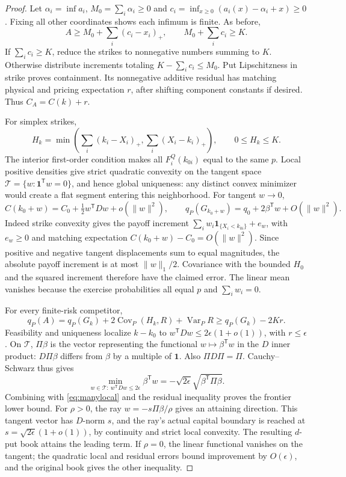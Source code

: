 \documentclass[11pt,a4paper]{amsart}
\theoremstyle{plain}
\theoremstyle{definition}
\theoremstyle{remark}
\DeclareMathOperator{\Var}{Var}
\DeclareMathOperator{\Cov}{Cov}
\newcommand{\one}{\mathbf{1}}
\begin{document}
\begin{proof}
Let $\alpha_i=\inf a_i$, $M_0=\sum_i\alpha_i\ge0$ and
$c_i=\inf_{x\ge0}(a_i(x)-\alpha_i+x)\ge0$. Fixing all other coordinates shows each infimum is finite. As before,
\[
 A\ge M_0+\sum_i(c_i-x_i)_+,\qquad M_0+\sum_i c_i\ge K.
\]
If $\sum_i c_i\ge K$, reduce the strikes to nonnegative numbers summing to $K$. Otherwise distribute increments totaling $K-\sum_i c_i\le M_0$. Put Lipschitzness in strike proves containment. Its nonnegative additive residual has matching physical and pricing expectation $r$, after shifting component constants if desired. Thus $C_A=C(k)+r$.

For simplex strikes,
\[
 H_k=\min\left(\sum_i(k_i-X_i)_+,\sum_i(X_i-k_i)_+\right),
 \qquad 0\le H_k\le K.
\]
The interior first-order condition makes all $F_i^Q(k_{0i})$ equal to the same $p$. Local positive densities give strict quadratic convexity on the tangent space
$\mathcal T=\{w:\one^{\mathsf T}w=0\}$, and hence global uniqueness: any distinct convex minimizer would create a flat segment entering this neighborhood. For tangent $w\to0$,
\begin{equation}\label{eq:manylocal}
 C(k_0+w)=C_0+\tfrac12w^{\mathsf T}Dw+o(\|w\|^2),\qquad
 q_P(G_{k_0+w})=q_0+2\beta^{\mathsf T}w+O(\|w\|^2).
\end{equation}
Indeed strike convexity gives the payoff increment
$\sum_iw_i\one_{\{X_i<k_{0i}\}}+e_w$, with $e_w\ge0$ and matching expectation $C(k_0+w)-C_0=O(\|w\|^2)$. Since positive and negative tangent displacements sum to equal magnitudes, the absolute payoff increment is at most $\|w\|_1/2$. Covariance with the bounded $H_0$ and the squared increment therefore have the claimed error. The linear mean vanishes because the exercise probabilities all equal $p$ and $\sum_iw_i=0$.

For every finite-risk competitor,
\[
 q_P(A)=q_P(G_k)+2\Cov_P(H_k,R)+\Var_PR
 \ge q_P(G_k)-2Kr.
\]
Feasibility and uniqueness localize $k-k_0$ to
$w^{\mathsf T}Dw\le2\epsilon(1+o(1))$, with $r\le\epsilon$.
On $\mathcal T$, $\Pi\beta$ is the vector representing the functional $w\mapsto\beta^{\mathsf T}w$ in the $D$ inner product: $D\Pi\beta$ differs from $\beta$ by a multiple of $\one$. Also $\Pi D\Pi=\Pi$. Cauchy--Schwarz thus gives
\[
 \min_{w\in\mathcal T:\ w^{\mathsf T}Dw\le2\epsilon}
 \beta^{\mathsf T}w=-\sqrt{2\epsilon}\sqrt{\beta^{\mathsf T}\Pi\beta}.
\]
Combining with \eqref{eq:manylocal} and the residual inequality proves the frontier lower bound. For $\rho>0$, the ray $w=-s\Pi\beta/\rho$ gives an attaining direction. This tangent vector has $D$-norm $s$, and the ray's actual capital boundary is reached at $s=\sqrt{2\epsilon}(1+o(1))$, by continuity and strict local convexity. The resulting $d$-put book attains the leading term. If $\rho=0$, the linear functional vanishes on the tangent; the quadratic local and residual errors bound improvement by $O(\epsilon)$, and the original book gives the other inequality.
\end{proof}
\end{document}
